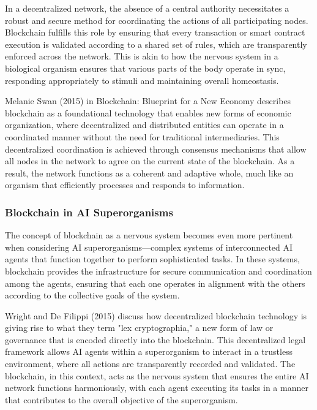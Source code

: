 \documentclass[12pt,twoside]{article}
\begin{document}
In a decentralized network, the absence of a central authority necessitates a robust and secure method for coordinating the actions of all participating nodes. Blockchain fulfills this role by ensuring that every transaction or smart contract execution is validated according to a shared set of rules, which are transparently enforced across the network. This is akin to how the nervous system in a biological organism ensures that various parts of the body operate in sync, responding appropriately to stimuli and maintaining overall homeostasis.

Melanie Swan (2015) in Blockchain: Blueprint for a New Economy describes blockchain as a foundational technology that enables new forms of economic organization, where decentralized and distributed entities can operate in a coordinated manner without the need for traditional intermediaries. This decentralized coordination is achieved through consensus mechanisms that allow all nodes in the network to agree on the current state of the blockchain. As a result, the network functions as a coherent and adaptive whole, much like an organism that efficiently processes and responds to information.

\subsubsection{Blockchain in AI Superorganisms}

The concept of blockchain as a nervous system becomes even more pertinent when considering AI superorganisms—complex systems of interconnected AI agents that function together to perform sophisticated tasks. In these systems, blockchain provides the infrastructure for secure communication and coordination among the agents, ensuring that each one operates in alignment with the others according to the collective goals of the system.

Wright and De Filippi (2015) discuss how decentralized blockchain technology is giving rise to what they term "lex cryptographia," a new form of law or governance that is encoded directly into the blockchain. This decentralized legal framework allows AI agents within a superorganism to interact in a trustless environment, where all actions are transparently recorded and validated. The blockchain, in this context, acts as the nervous system that ensures the entire AI network functions harmoniously, with each agent executing its tasks in a manner that contributes to the overall objective of the superorganism.
\end{document}
